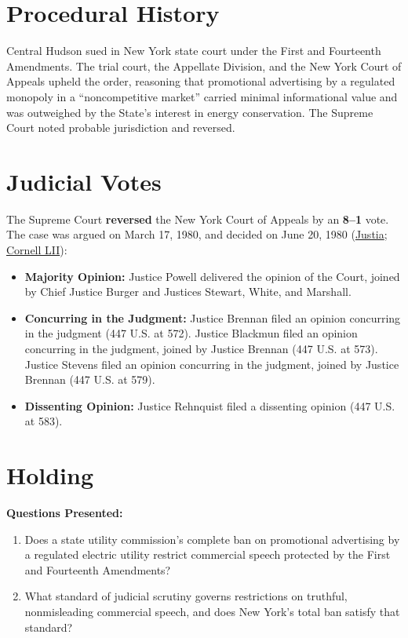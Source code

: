 \documentclass[12pt]{article}
\begin{document}
\section{Procedural History}
Central Hudson sued in New York state court under the First and Fourteenth Amendments. The trial court, the Appellate Division, and the New York Court of Appeals upheld the order, reasoning that promotional advertising by a regulated monopoly in a ``noncompetitive market'' carried minimal informational value and was outweighed by the State's interest in energy conservation. The Supreme Court noted probable jurisdiction and reversed.

\section{Judicial Votes}
The Supreme Court \textbf{reversed} the New York Court of Appeals by an \textbf{8--1} vote. The case was argued on March 17, 1980, and decided on June 20, 1980 (\href{https://supreme.justia.com/cases/federal/us/447/557/}{Justia}; \href{https://www.law.cornell.edu/supremecourt/text/447/557}{Cornell LII}):

\begin{itemize}
    \item \textbf{Majority Opinion:} Justice Powell delivered the opinion of the Court, joined by Chief Justice Burger and Justices Stewart, White, and Marshall.
    \item \textbf{Concurring in the Judgment:} Justice Brennan filed an opinion concurring in the judgment (447 U.S. at 572). Justice Blackmun filed an opinion concurring in the judgment, joined by Justice Brennan (447 U.S. at 573). Justice Stevens filed an opinion concurring in the judgment, joined by Justice Brennan (447 U.S. at 579).
    \item \textbf{Dissenting Opinion:} Justice Rehnquist filed a dissenting opinion (447 U.S. at 583).
\end{itemize}

\section{Holding}
\textbf{Questions Presented:}

\begin{enumerate}
  \item Does a state utility commission's complete ban on promotional advertising by a regulated electric utility restrict commercial speech protected by the First and Fourteenth Amendments?
  \item What standard of judicial scrutiny governs restrictions on truthful, nonmisleading commercial speech, and does New York's total ban satisfy that standard?
\end{enumerate}
\end{document}
